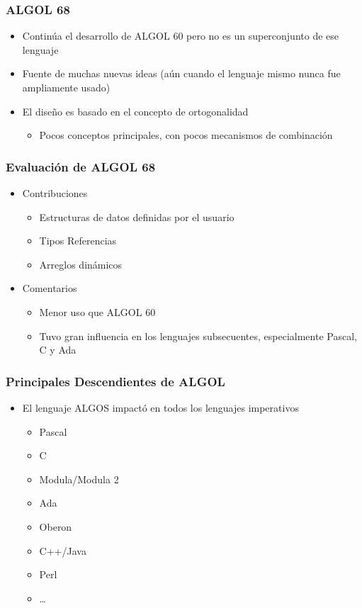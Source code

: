 \documentclass[11pt]{article}
\begin{document}
\subsubsection*{ALGOL 68}
\label{sec:orgheadline82}
\begin{itemize}
\item Continúa el desarrollo de ALGOL 60 pero no es un superconjunto de
ese lenguaje
\item Fuente de muchas nuevas ideas (aún cuando el lenguaje mismo nunca
fue ampliamente usado)
\item El diseño es basado en el concepto de ortogonalidad
\begin{itemize}
\item Pocos conceptos principales, con pocos mecanismos de combinación
\end{itemize}
\end{itemize}

\subsubsection*{Evaluación de ALGOL 68}
\label{sec:orgheadline83}
\begin{itemize}
\item Contribuciones
\begin{itemize}
\item Estructuras de datos definidas por el usuario
\item Tipos Referencias
\item Arreglos dinámicos
\end{itemize}
\item Comentarios
\begin{itemize}
\item Menor uso que ALGOL 60
\item Tuvo gran influencia en los lenguajes subsecuentes, especialmente
Pascal, C y Ada
\end{itemize}
\end{itemize}

\subsubsection*{Principales Descendientes de ALGOL}
\label{sec:orgheadline84}
\begin{itemize}
\item El lenguaje ALGOS impactó en todos los lenguajes imperativos
\begin{itemize}
\item Pascal
\item C
\item Modula/Modula 2
\item Ada
\item Oberon
\item C++/Java
\item Perl
\item \ldots{}
\end{itemize}
\end{itemize}
\end{document}
